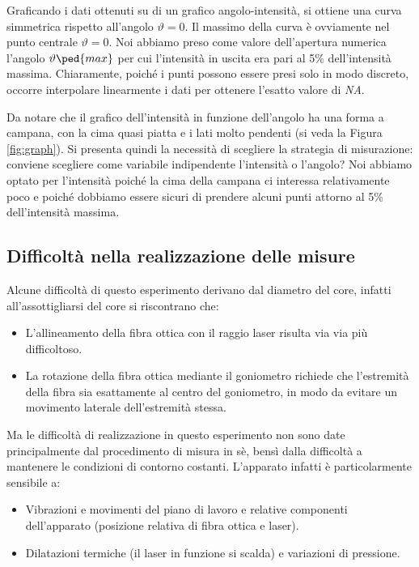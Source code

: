 Graficando i dati ottenuti su di un grafico angolo-intensità, si ottiene una curva simmetrica rispetto all'angolo $\vartheta = 0$.
Il massimo della curva è ovviamente nel punto centrale $\vartheta = 0$. Noi abbiamo preso come valore dell'apertura numerica
l'angolo $\vartheta\ped{max}$ per cui l'intensità in uscita era pari al 5\% dell'intensità massima. Chiaramente, poiché i punti
possono essere presi solo in modo discreto, occorre interpolare linearmente i dati per ottenere l'esatto valore di \emph{NA}.

Da notare che il grafico dell'intensità in funzione dell'angolo ha una forma a campana, con la cima quasi piatta e i lati molto pendenti
(si veda la Figura \ref{fig:graph}). Si presenta quindi la necessità di scegliere la strategia di misurazione: conviene
scegliere come variabile indipendente l'intensità o l'angolo? Noi abbiamo optato per l'intensità poiché la cima della campana
ci interessa relativamente poco e poiché dobbiamo essere sicuri di prendere alcuni punti attorno al 5\% dell'intensità massima.

\subsection{Difficoltà nella realizzazione delle misure}

Alcune difficoltà di questo esperimento derivano dal diametro del core, infatti all'assottigliarsi del core si riscontrano che:
\begin{itemize}
    \item{L'allineamento della fibra ottica con il raggio laser risulta via via più difficoltoso.}
    \item{La rotazione della fibra ottica mediante il goniometro richiede che l'estremità della fibra sia esattamente
        al centro del goniometro, in modo da evitare un movimento laterale dell'estremità stessa.}
\end{itemize}
Ma le difficoltà di realizzazione in questo esperimento non sono date principalmente dal procedimento di misura in sè, bensì dalla difficoltà a mantenere le condizioni di contorno costanti. L'apparato infatti è particolarmente sensibile a:
\begin{itemize}
	\item{Vibrazioni e movimenti del piano di lavoro e relative componenti dell'apparato (posizione relativa di fibra ottica e laser).}
	\item{Dilatazioni termiche (il laser in funzione si scalda) e variazioni di pressione.}
\end{itemize}

